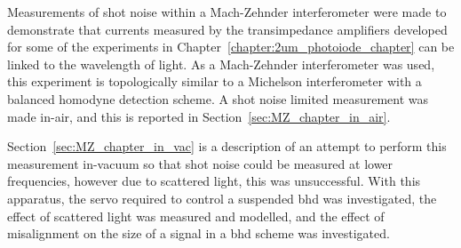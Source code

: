 Measurements of shot noise within a Mach-Zehnder interferometer were made to demonstrate that currents measured by the transimpedance amplifiers developed for some of the experiments in Chapter~\ref{chapter:2um_photoiode_chapter} can be linked to the wavelength of light. As a Mach-Zehnder interferometer was used, this experiment is topologically similar to a Michelson interferometer with a balanced homodyne detection scheme. A shot noise limited measurement was made in-air, and this is reported in Section~\ref{sec:MZ_chapter_in_air}.
\par 
Section~\ref{sec:MZ_chapter_in_vac} is a description of an attempt to perform this measurement in-vacuum so that shot noise could be measured at lower frequencies, however due to scattered light, this was unsuccessful. With this apparatus, the servo required to control a suspended \gls{bhd} was investigated, the effect of scattered light was measured and modelled, and the effect of misalignment on the size of a signal in a \gls{bhd} scheme was investigated.
